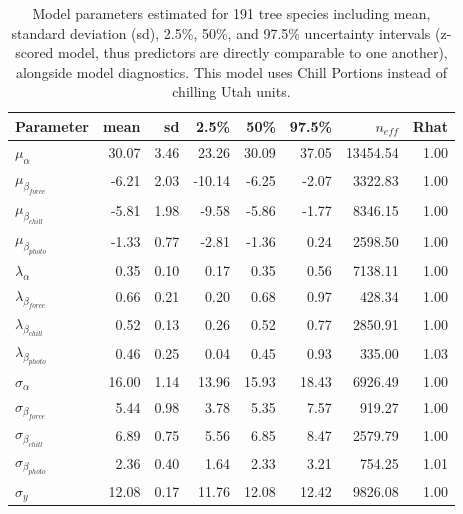 \documentclass[11pt]{article}
\begin{document}
\begin{table}[ht]
\centering
\caption{Model parameters estimated for 191 tree species including mean, standard deviation (sd), 2.5\%, 50\%, and 97.5\% uncertainty intervals (z-scored model, thus predictors are directly comparable to one another), alongside model diagnostics. This model uses Chill Portions instead of chilling Utah units.} 
\label{tab:modelanglambchillports}
\begingroup\footnotesize
\begin{tabular}{lrrrrrrr}
  \hline
Parameter & mean & sd & 2.5\% & 50\% & 97.5\% & $n_{eff}$ & Rhat \\ 
  \hline
$\mu_{\alpha}$ & 30.07 & 3.46 & 23.26 & 30.09 & 37.05 & 13454.54 & 1.00 \\ 
  $\mu_{\beta_{force}}$ & -6.21 & 2.03 & -10.14 & -6.25 & -2.07 & 3322.83 & 1.00 \\ 
  $\mu_{\beta_{chill}}$ & -5.81 & 1.98 & -9.58 & -5.86 & -1.77 & 8346.15 & 1.00 \\ 
  $\mu_{\beta_{photo}}$ & -1.33 & 0.77 & -2.81 & -1.36 & 0.24 & 2598.50 & 1.00 \\ 
  $\lambda_{\alpha}$ & 0.35 & 0.10 & 0.17 & 0.35 & 0.56 & 7138.11 & 1.00 \\ 
  $\lambda_{\beta_{force}}$ & 0.66 & 0.21 & 0.20 & 0.68 & 0.97 & 428.34 & 1.00 \\ 
  $\lambda_{\beta_{chill}}$ & 0.52 & 0.13 & 0.26 & 0.52 & 0.77 & 2850.91 & 1.00 \\ 
  $\lambda_{\beta_{photo}}$ & 0.46 & 0.25 & 0.04 & 0.45 & 0.93 & 335.00 & 1.03 \\ 
  $\sigma_{\alpha}$ & 16.00 & 1.14 & 13.96 & 15.93 & 18.43 & 6926.49 & 1.00 \\ 
  $\sigma_{\beta_{force}}$ & 5.44 & 0.98 & 3.78 & 5.35 & 7.57 & 919.27 & 1.00 \\ 
  $\sigma_{\beta_{chill}}$ & 6.89 & 0.75 & 5.56 & 6.85 & 8.47 & 2579.79 & 1.00 \\ 
  $\sigma_{\beta_{photo}}$ & 2.36 & 0.40 & 1.64 & 2.33 & 3.21 & 754.25 & 1.01 \\ 
  $\sigma_y$ & 12.08 & 0.17 & 11.76 & 12.08 & 12.42 & 9826.08 & 1.00 \\ 
   \hline
\end{tabular}
\endgroup
\end{table} \clearpage \pagebreak 
\end{document}
